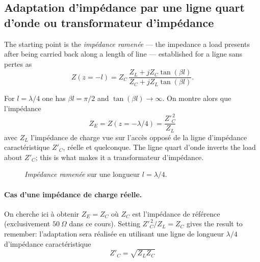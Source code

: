 \subsection{Adaptation d'impédance par une ligne quart d'onde ou transformateur d'impédance}
The starting point is the \textit{impédance ramenée} --- the impedance a load presents
after being carried back along a length of line --- established for a ligne sans pertes
as
\[Z(z = -l) = Z_C\,\frac{Z_L + j Z_C \tan(\beta l)}{Z_C + j Z_L \tan(\beta l)}.\]

\begin{prop}
  For $l = \lambda/4$ one has $\beta l = \pi/2$ and $\tan(\beta l) \to \infty$. On
  montre alors que l'impédance
  \[\boxed{\;Z_E = Z\!\left(z = -\lambda/4\right) = \frac{Z'^{\,2}_C}{Z_L}\;}\]
  avec $Z_L$ l'impédance de charge vue sur l'accès opposé de la ligne d'impédance
  caractéristique $Z'_C$, réelle et quelconque. The ligne quart d'onde inverts the load
  about $Z'_C$; this is what makes it a transformateur d'impédance.
\end{prop}

\begin{figure}[h!]
  \centering
  \caption*{\textit{Impédance ramenée} sur une longueur $l = \lambda/4$.}
\end{figure}

\paragraph{Cas d'une impédance de charge réelle.} On cherche ici à obtenir
$Z_E = Z_C$ où $Z_C$ est l'impédance de référence (exclusivement $50\ \Omega$ dans ce
cours). Setting $Z'^{\,2}_C/Z_L = Z_C$ gives the result to remember: l'adaptation sera
réalisée en utilisant une ligne de longueur $\lambda/4$ d'impédance caractéristique
\[\boxed{\;Z'_C = \sqrt{Z_L Z_C}\;}\]

